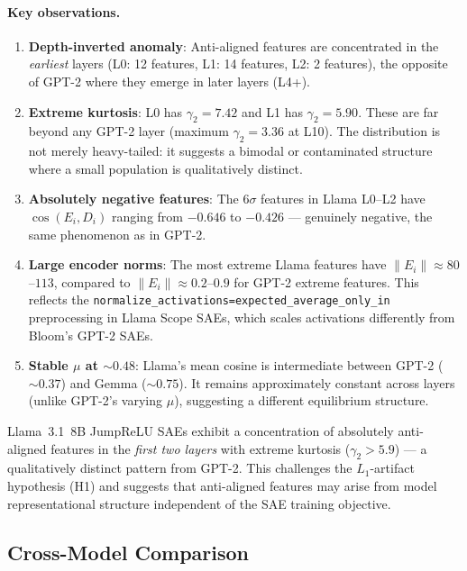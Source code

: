 \documentclass[11pt,a4paper]{article}
\newcommand{\cosED}{\cos(E_i, D_i)}
\begin{document}
\paragraph{Key observations.}
\begin{enumerate}
  \item \textbf{Depth-inverted anomaly}: Anti-aligned features are concentrated in the \emph{earliest} layers (L0: 12 features, L1: 14 features, L2: 2 features), the opposite of GPT-2 where they emerge in later layers (L4+).
  \item \textbf{Extreme kurtosis}: L0 has $\gamma_2 = 7.42$ and L1 has $\gamma_2 = 5.90$. These are far beyond any GPT-2 layer (maximum $\gamma_2 = 3.36$ at L10). The distribution is not merely heavy-tailed: it suggests a bimodal or contaminated structure where a small population is qualitatively distinct.
  \item \textbf{Absolutely negative features}: The 6$\sigma$ features in Llama L0--L2 have $\cosED$ ranging from $-0.646$ to $-0.426$ --- genuinely negative, the same phenomenon as in GPT-2.
  \item \textbf{Large encoder norms}: The most extreme Llama features have $\|E_i\| \approx 80$--$113$, compared to $\|E_i\| \approx 0.2$--$0.9$ for GPT-2 extreme features. This reflects the \texttt{normalize\_activations=expected\_average\_only\_in} preprocessing in Llama Scope SAEs, which scales activations differently from Bloom's GPT-2 SAEs.
  \item \textbf{Stable $\mu$ at $\sim 0.48$}: Llama's mean cosine is intermediate between GPT-2 ($\sim0.37$) and Gemma ($\sim0.75$). It remains approximately constant across layers (unlike GPT-2's varying $\mu$), suggesting a different equilibrium structure.
\end{enumerate}

\begin{keyinsight}
Llama~3.1~8B JumpReLU SAEs exhibit a concentration of absolutely anti-aligned features in the \emph{first two layers} with extreme kurtosis ($\gamma_2 > 5.9$) --- a qualitatively distinct pattern from GPT-2. This challenges the $L_1$-artifact hypothesis (H1) and suggests that anti-aligned features may arise from model representational structure independent of the SAE training objective.
\end{keyinsight}

\subsection{Cross-Model Comparison}
\label{sec:comparison}
\end{document}
